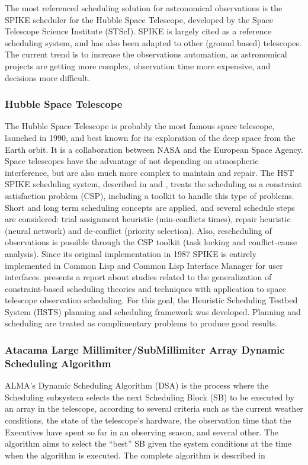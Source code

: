\documentclass[11pt]{article}
\begin{document}
The most referenced scheduling solution for astronomical observations is the SPIKE scheduler for the Hubble Space Telescope, developed by the Space Telescope Science Institute (STScI). SPIKE is largely cited as a reference scheduling system, and has also been adapted to other (ground based) telescopes. The current trend is to increase the observations automation, as astronomical projects are getting more complex, observation time more expensive, and decisions more difficult.

\subsubsection{Hubble Space Telescope}
The Hubble Space Telescope is probably the most famous space telescope, launched in 1990, and best known for its exploration of the deep space from the Earth orbit. It is a collaboration between NASA and the European Space Agency. Space telescopes have the advantage of not depending on atmospheric interference, but are also much more complex to maintain and repair. The HST SPIKE scheduling system, described in \cite{johnston90} and \cite{zweben94}, treats the scheduling as a constraint satisfaction problem (CSP), including a toolkit to handle this type of problems. Short and long term scheduling concepts are applied, and several schedule steps are considered: trial assignment heuristic (min-conflicts times), repair heuristic (neural network) and de-conflict (priority selection). Also, rescheduling of observations is possible through the CSP toolkit (task locking and conflict-cause analysis). Since its original implementation in 1987 SPIKE is entirely implemented in Common Lisp and Common Lisp Interface Manager for user interfaces. \cite{muscettola96} presents a report about studies related to the generalization of constraint-based scheduling theories and techniques with application to space telescope observation scheduling. For this goal, the Heuristic Scheduling Testbed System (HSTS) planning and scheduling framework was developed. Planning and scheduling are treated as complimentary problems to produce good results.

\subsubsection{Atacama Large Millimiter/SubMillimiter Array Dynamic Scheduling Algorithm}
\label{sec:alma-dsa}

ALMA's Dynamic Scheduling Algorithm (DSA) is the process where the Scheduling subsystem selects the next Scheduling Block (SB) to be executed by an array in the telescope, according to several criteria such as the current weather conditions, the state of the telescope's hardware, the observation time that the Executives have spent so far in an observing season, and several other. The algorithm aims to select the ``best'' SB given the system conditions at the time when the algorithm is executed. The complete algorithm is described in \cite{avarias11} 
\end{document}
